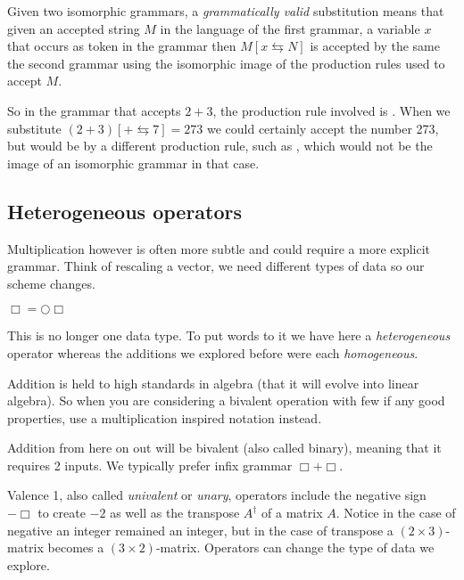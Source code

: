 \begin{definition}
    Given two isomorphic grammars, a \emph{grammatically valid} substitution means 
    that given an accepted string $M$ in the language of the first grammar,
    a variable $x$ that occurs as token in the grammar
    then     $M[x\leftrightarrows N]$ is accepted by the same 
    the second grammar using the isomorphic image of the 
    production rules used to accept $M$.
\end{definition}

So in the grammar that accepts $2+3$, the production rule involved 
is .  When we substitute 
$(2+3)[+\leftrightarrows 7]=273$ we could certainly accept the number 
273, but would be by a different production rule, such as , 
which would not be the image of an isomorphic grammar in that case.


\subsection{Heterogeneous operators}
Multiplication however is often more subtle and 
could require a more explicit grammar.  Think of rescaling a vector, we need 
different types of data so our scheme changes.
\begin{center}
    $\Box = \bigcirc \Box$
\end{center}    
This is no longer one data type.  To put words to it we have here a \emph{heterogeneous}
operator whereas the additions we explored before were each \emph{homogeneous}.

Addition is held to high standards in algebra
(that it will evolve into linear algebra).  So when you are considering a bivalent
operation with few if any good properties, use a multiplication inspired
notation instead.   


Addition from here on out will be bivalent (also called binary), meaning 
that it requires 2 inputs.  We typically prefer infix grammar $\Box +\Box$.




 Valence
1, also called \emph{univalent} or \emph{unary}, operators include the negative
sign $-\Box$ to create $-2$ as well as the transpose $A^{\dagger}$ of a matrix
$A$. Notice in the case of negative an integer remained an integer, but in the
case of transpose a $(2\times 3)$-matrix becomes a $(3\times 2)$-matrix.
Operators can change the type of data we explore.
 
